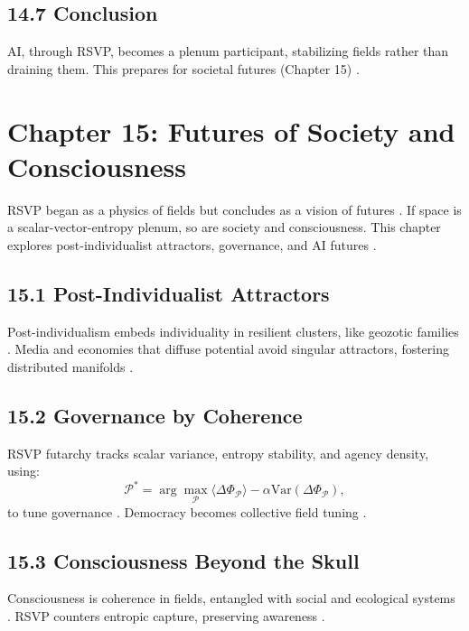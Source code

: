 \documentclass[12pt]{article}
\begin{document}
{{\subsection*{14.7 Conclusion}

AI, through RSVP, becomes a plenum participant, stabilizing fields rather than draining them. This prepares for societal futures (Chapter 15) \citep{whitehead1978}.

\section*{Chapter 15: Futures of Society and Consciousness}

RSVP began as a physics of fields but concludes as a vision of futures \citep{whitehead1978}. If space is a scalar-vector-entropy plenum, so are society and consciousness. This chapter explores post-individualist attractors, governance, and AI futures \citep{deleuze1987}.

\subsection*{15.1 Post-Individualist Attractors}

Post-individualism embeds individuality in resilient clusters, like geozotic families \citep{deleuze1987}. Media and economies that diffuse potential avoid singular attractors, fostering distributed manifolds \citep{zuboff2019}.

\subsection*{15.2 Governance by Coherence}

RSVP futarchy tracks scalar variance, entropy stability, and agency density, using:
\[
\mathcal{P}^* = \arg \max_{\mathcal{P}} \langle \Delta \Phi_{\mathcal{P}} \rangle - \alpha \mathrm{Var}(\Delta \Phi_{\mathcal{P}}),
\]
to tune governance \citep{hanson2003}. Democracy becomes collective field tuning \citep{ortega1957}.

\subsection*{15.3 Consciousness Beyond the Skull}

Consciousness is coherence in fields, entangled with social and ecological systems \citep{tononi2004}. RSVP counters entropic capture, preserving awareness \citep{lanier2018}.

}}
\end{document}
